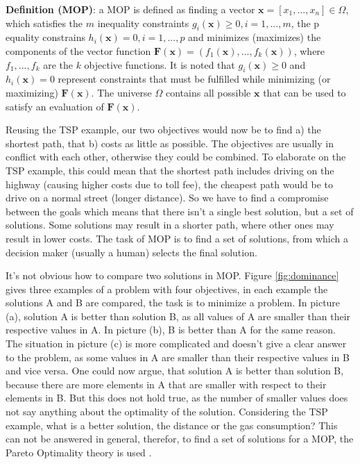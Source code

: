 \noindent\textbf{Definition (MOP)}: a MOP is defined as finding a vector $\mathbf{x} = [x_1,...,x_n] \in \Omega$, which satisfies the $m$ inequality constraints $g_i(\mathbf{x}) \ge 0, i=1,...,m$, the p equality constrains $h_i(\mathbf{x}) = 0, i=1,...,p$ and minimizes (maximizes) the components of the vector function $\mathbf{F}(\mathbf{x}) = (f_1(\mathbf{x}), ..., f_k(\mathbf{x}))$, where $f_1,...,f_k$ are the $k$ objective functions. It is noted that $g_i(\mathbf{x}) \ge 0$ and $h_i(\mathbf{x}) = 0$ represent constraints that must be fulfilled while minimizing (or maximizing) $\mathbf{F}(\mathbf{x})$. The universe $\Omega$ contains all possible $\mathbf{x}$ that can be used to satisfy an evaluation of $\mathbf{F}(\mathbf{x})$.

Reusing the TSP example, our two objectives would now be to find a) the shortest path, that b) costs as little as possible. The objectives are usually in conflict with each other, otherwise they could be combined. To elaborate on the TSP example, this could mean that the shortest path includes driving on the highway (causing higher costs due to toll fee), the cheapest path would be to drive on a normal street (longer distance). So we have to find a compromise between the goals which means that there isn't a single best solution, but a set of solutions. Some solutions may result in a shorter path, where other ones may result in lower costs. The task of MOP is to find a set of solutions, from which a decision maker (usually a human) selects the final solution.

It's not obvious how to compare two solutions in MOP. Figure \ref{fig:dominance} gives three examples of a problem with four objectives, in each example the solutions A and B are compared, the task is to minimize a problem. In picture (a), solution A is better than solution B, as all values of A are smaller than their respective values in A. In picture (b), B is better than A for the same reason. The situation in picture (c) is more complicated and doesn't give a clear answer to the problem, as some values in A are smaller than their respective values in B and vice versa. One could now argue, that solution A is better than solution B, because there are more elements in A that are smaller with respect to their elements in B. But this does not hold true, as the number of smaller values does not say anything about the optimality of the solution. Considering the TSP example, what is a better solution, the distance or the gas consumption? This can not be answered in general, therefor, to find a set of solutions for a MOP, the Pareto Optimality theory is used \cite{ehrgott2005multicriteria}.

